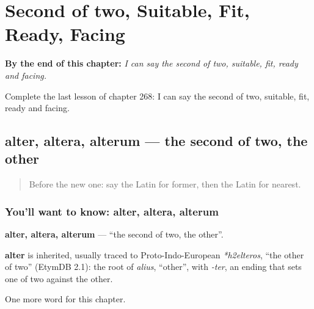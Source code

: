 
\chapter{Second of two, Suitable, Fit, Ready, Facing}
\label{ch:la-second-of-two-suitable-fit-ready-facing}

\begin{chapteropening}
\textbf{By the end of this chapter:} \emph{I can say the second of two, suitable, fit, ready and facing.}

Complete the last lesson of chapter 268: I can say the second of two, suitable, fit, ready and facing.
\end{chapteropening}

\section[alter, altera, alterum]{alter, altera, alterum — the second of two, the other}

\label{lesson:LA-C268-alter}



\begin{quote}
Before the new one: say the Latin for former, then the Latin for nearest.
\end{quote}

\subsection*{You'll want to know: alter, altera, alterum}
\textbf{alter, altera, alterum} — \textquotedblleft{}the second of two, the other\textquotedblright{}.

\begin{cousinweb}
\textbf{alter} is inherited, usually traced to Proto-Indo-European \emph{*h2elteros}, \textquotedblleft{}the other of two\textquotedblright{} (EtymDB 2.1): the root of \emph{alius}, \textquotedblleft{}other\textquotedblright{}, with \emph{-ter}, an ending that sets one of two against the other.
\end{cousinweb}

\begin{grammarlens}[title={What you've built}]
One more word for this chapter.
\end{grammarlens}


